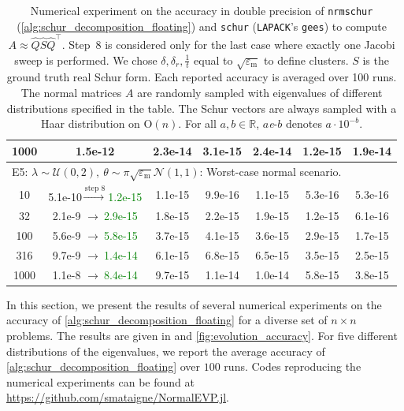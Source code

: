 \documentclass[10pt,twoside,dvipsnames]{siamart1116}
\numberwithin{algorithm}{section}
\numberwithin{equation}{section}
\begin{document}
\begin{table}[ht]
\begin{tabular}{||c||c|c||c|c||c|c||}
1000 & 1.5e-12 & 2.3e-14 & 3.1e-15 & 2.4e-14 & 1.2e-15 & 1.9e-14 \\
 \hline
 \multicolumn{7}{||l||}{E5: $\lambda\sim \mathcal{U}(0,2),\ \theta\sim \pi\sqrt{\varepsilon_\mathrm{m}}\mathcal{N}(1,1)$: Worst-case normal scenario.}\\
	 \hline
10 & 5.1e-10$\overset{\text{step 8}}{ \rightarrow \ }$\textcolor{Green}{1.2e-15} & 1.1e-15 & 9.9e-16 & 1.1e-15 & 5.3e-16 & 5.3e-16 \\
32 & 2.1e-9 $\rightarrow \ $\textcolor{Green}{2.9e-15}& 1.8e-15 & 2.2e-15 & 1.9e-15 & 1.2e-15 & 6.1e-16 \\
100 & 5.6e-9 $\rightarrow \ $\textcolor{Green}{5.8e-15} & 3.7e-15 & 4.1e-15 & 3.6e-15 & 2.9e-15 & 1.7e-15 \\
316 & 9.7e-9 $\rightarrow \ $\textcolor{Green}{1.4e-14}& 6.1e-15 & 6.8e-15 & 6.5e-15 & 3.5e-15 & 2.5e-15 \\
1000 & 1.1e-8 $\rightarrow \ $\textcolor{Green}{8.4e-14}& 9.7e-15 & 1.1e-14 & 1.0e-14 & 5.8e-15 & 3.8e-15 \\
	 \hline
	 \end{tabular}
	 \caption{\justifying Numerical experiment on the accuracy in double precision of \texttt{nrmschur} (\cref{alg:schur_decomposition_floating}) and \texttt{schur} (\texttt{LAPACK}'s \texttt{gees}) to compute $A\approx\widehat{Q}\widehat{S}\widehat{Q}^\top $. Step~8 is considered only for the last case where exactly one Jacobi sweep is performed. We chose $\delta,\delta_r,\frac{1}{t}$ equal to $\sqrt{\varepsilon_\mathrm{m}}$ to define clusters. $S$ is the ground truth real Schur form. Each reported accuracy is averaged over 100 runs. The normal matrices $A$ are randomly sampled with eigenvalues of different distributions specified in the table. The Schur vectors are always sampled with a Haar distribution on $\mathrm{O}(n)$. For all $a,b\in\mathbb{R}$, $a$\emph{e}-$b$  denotes $a\cdot10^{-b}$.}
	 \label{tab:accuracy}
	 \vspace*{-0.8cm}
	 \end{table}
In this section, we present the results of several numerical experiments on the accuracy of \cref{alg:schur_decomposition_floating} for a diverse set of $n\times n$ problems. The results are given in  and \cref{fig:evolution_accuracy}. For five different distributions of the eigenvalues, we report the average accuracy of  \cref{alg:schur_decomposition_floating} over $100$ runs. Codes reproducing the numerical experiments can be found at \url{https://github.com/smataigne/NormalEVP.jl}.
\end{document}
